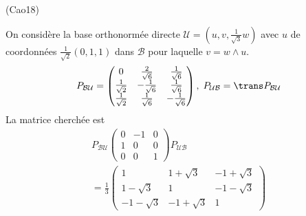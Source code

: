 \begin{tiny}(Cao18)\end{tiny} On considère la base orthonormée directe $\mathcal{U}=(u,v,\frac{1}{\sqrt{3}}w)$ avec $u$ de coordonnées $\frac{1}{\sqrt{2}}(0,1,1)$ dans $\mathcal{B}$ pour laquelle $v = w\wedge u$.  
\begin{displaymath}
 P_{\mathcal{B}\mathcal{U}}=
\begin{pmatrix}
 0 & \frac{2}{\sqrt{6}} & \frac{1}{\sqrt{6}}  \\
\frac{1}{\sqrt{2}} & -\frac{1}{\sqrt{6}} & \frac{1}{\sqrt{6}} \\
\frac{1}{\sqrt{2}} & \frac{1}{\sqrt{6}} & -\frac{1}{\sqrt{6}}
\end{pmatrix},\;
P_{\mathcal{U}\mathcal{B}} = \trans P_{\mathcal{B}\mathcal{U}} 
\end{displaymath}
La matrice cherchée est
\begin{multline*}
P_{\mathcal{B}\mathcal{U}}
 \begin{pmatrix}
  0 & -1 & 0 \\ 1 & 0 & 0 \\0 & 0 & 1
 \end{pmatrix}
P_{\mathcal{U}\mathcal{B}}\\
= \frac{1}{3}
\begin{pmatrix}
 1 & 1+\sqrt{3} & -1+\sqrt{3} \\
 1-\sqrt{3} & 1 & -1-\sqrt{3} \\
-1-\sqrt{3} & -1+\sqrt{3} & 1
\end{pmatrix}
\end{multline*}
